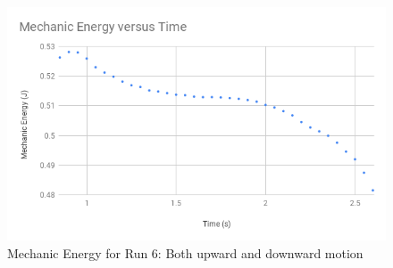 \begin{figure}[ht]
    \centering
    \includegraphics[scale=0.71]{image/07-mechanic/energy-6.png}
    \caption{Mechanic Energy for Run 6: Both upward and downward motion}
    \label{figure.07.run.6.e}
\end{figure}
